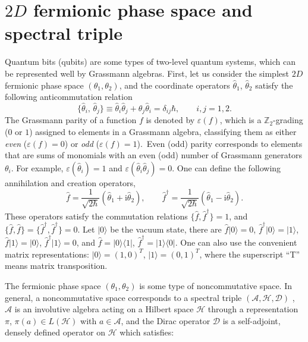 \documentclass[a4paper,12pt]{article}
\begin{document}
\section{$2D$ fermionic phase space and spectral triple}\label{sec2}
Quantum bits (qubits) are some types of two-level quantum systems, which can be represented well by Grassmann algebras.
First, let us consider the simplest $2D$ fermionic phase space $(\theta_1,\theta_2)$, and the coordinate operators $\hat{\theta}_1$, $\hat{\theta}_2$ satisfy the following anticommutation relation
\begin{equation}
	\{\hat{\theta}_i,\,\hat{\theta}_j\}\equiv \hat{\theta}_i \hat{\theta}_j+\hat{\theta}_j \hat{\theta}_i=\delta_{ij}\hbar,
	\qquad i,j=1,2.
\end{equation}
The Grassmann parity of a function $f$ is denoted by
$\varepsilon(f)$, 
which is a $\mathbb{Z}_{2}$-grading ($0$ or $1$) assigned to elements in a Grassmann algebra, classifying them as either \textit{even} ($\varepsilon(f)=0$) or \textit{odd} ($\varepsilon(f)=1$). Even (odd) parity corresponds to elements that are sums of monomials with an even (odd) number of Grassmann generators $\theta_i$.
For example, $\varepsilon (\hat{\theta}_i)=1$ and
$\varepsilon (\hat{\theta}_i \hat{\theta}_j)=0$.
One can define the following annihilation and creation operators,
\begin{equation}
	\hat{f}=\frac{1}{\sqrt{2\hbar}}\left(\hat{\theta}_{1}
	+\mathrm{i}\hat{\theta}_{2}\right),\qquad
	\hat{f}^\dag=\frac{1}{\sqrt{2\hbar}}\left(\hat{\theta}_{1}
	-\mathrm{i}\hat{\theta}_{2}\right).
\end{equation}
These operators satisfy the commutation relations $\{\hat{f},\hat{f}^{\dag}\}=1$, and $\{\hat{f},\hat{f}\}=\{\hat{f}^{\dag},\hat{f}^{\dag}\}=0$.
Let $|0 \rangle$ be the vacuum
state, there are $\hat{f}|0\rangle=0$, $\hat{f}^{\dag}|0\rangle=|1\rangle$, $\hat{f}|1\rangle=|0\rangle$, $\hat{f}^{\dag}|1\rangle=0$, and $\hat{f}=|0\rangle \langle 1 |$, $\hat{f}^\dag=|1 \rangle
\langle 0 |$.
One can also use the convenient matrix representations: $|0 \rangle=(1,0)^T$,
$|1 \rangle=(0,1)^T$, where the superscript ``T'' means matrix transposition.

The fermionic phase space $(\theta_1,\theta_2)$ is some type of noncommutative space.
In general, a noncommutative space corresponds to a spectral triple $(\mathcal{A},\mathcal{H},\mathcal{D})$ \cite{Connes}, $\mathcal{A}$ is an involutive algebra acting on a Hilbert space $\mathcal{H}$ through a representation $\pi$, $\pi(a)\in L(\mathcal{H})$ with $a\in\mathcal{A}$, and the Dirac operator $\mathcal{D}$ is a self-adjoint, densely defined operator on $\mathcal{H}$ which satisfies:
\end{document}

